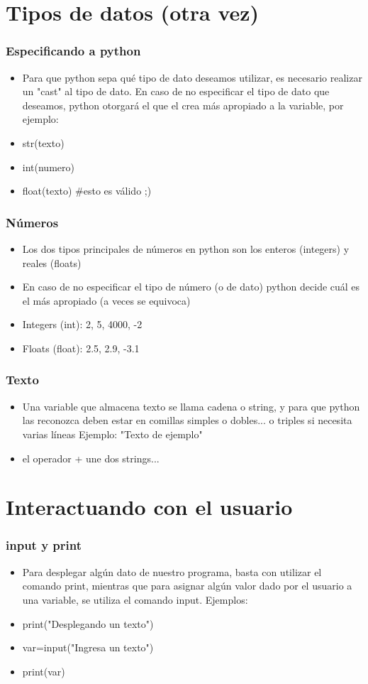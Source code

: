 \documentclass[hyperref={pdfpagelabels=false},xcolor=pst,pdf,fragile]{beamer}
\begin{document}
\section{Tipos de datos (otra vez)}
\begin{frame}
    \frametitle{Especificando a python}
    \pause
    \begin{itemize}
    \item Para que python sepa qué tipo de dato deseamos utilizar, es necesario realizar un "cast" al tipo de dato. En caso de no especificar el tipo de dato que deseamos, python otorgará el que el crea más apropiado a la variable, por ejemplo:
    \item str(texto)
    \item int(numero)
    \item float(texto) \pause \#esto es válido ;)
    \end{itemize}
\end{frame}

\begin{frame}
    \frametitle{Números}
    \pause
    \begin{itemize}
    \item Los dos tipos principales de números en python son los enteros (integers) y reales (floats)
    \item En caso de no especificar el tipo de número (o de dato) python decide cuál es el más apropiado (a veces se equivoca)
    \item Integers (int): 2, 5, 4000, -2
    \item Floats (float): 2.5, 2.9, -3.1
    \end{itemize}
\end{frame}

\begin{frame}
    \frametitle{Texto}
    \pause
    \begin{itemize}
    \item Una variable que almacena texto se llama cadena o string, y para que python las reconozca deben estar en comillas simples o dobles... o triples si necesita varias líneas
    Ejemplo: "Texto de ejemplo"
    \item el operador + une dos strings...
    \end{itemize}
\end{frame}

\section{Interactuando con el usuario}
\begin{frame}
    \frametitle{input y print}
    \pause
    \begin{itemize}
    \item Para desplegar algún dato de nuestro programa, basta con utilizar el comando print, mientras que para asignar algún valor dado por el usuario a una variable, se utiliza el comando input. Ejemplos:
    \item print("Desplegando un texto")
    \item var=input("Ingresa un texto")
    \item print(var)
    \end{itemize}
\end{frame}
\end{document}
